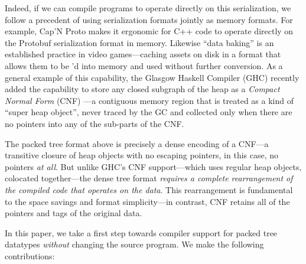 \documentclass[a4paper,english]{lipics-v2016}
\begin{document}
Indeed, if we can compile programs to operate directly on this serialization, we
follow a precedent of using serialization formats jointly as memory formats.
For example, Cap'N Proto \cite{capnproto} makes it ergonomic for C++ code to operate directly
on the Protobuf serialization format in memory.  Likewise ``data baking''
\cite{data-baking} is an established practice in video games---caching assets on
disk in a format that allows them to be 'd into memory and used
without further conversion.  As a general example of this capability, the
Glasgow Haskell Compiler (GHC) recently added the capability to store any closed
subgraph of the heap as a {\em Compact Normal Form} (CNF) \cite{cnf-icfp15}---a
contiguous memory region that is treated as a kind of ``super heap object'', never
traced by the GC and collected only when there are no pointers into any of the
sub-parts of the CNF.

The packed tree format above is precisely a dense encoding of a CNF---a
transitive closure of heap objects with no escaping pointers, in this case, no
pointers {\em at all}.  But unlike GHC's CNF support---which uses regular heap
objects, colocated together---the dense tree format {\em requires a complete
rearrangement of the compiled code that operates on the data}. This
rearrangement is fundamental to the space savings and format
simplicity---in contrast, CNF retains all of the pointers and tags of
the original data.


In this paper, we take a first step towards compiler support for 
packed tree datatypes {\em without} changing the source program.  We make the
following contributions:

\newcommand{\calculus}{$\lambda^D_T$} %
\end{document}
